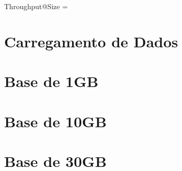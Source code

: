 \begin{myequation}%
\label{eq:2-2}
{\scriptstyle Throughput@Size} =  %
\end{myequation}
%

\section{Carregamento de Dados}



\section{Base de 1GB}

\section{Base de 10GB}

\section{Base de 30GB}

